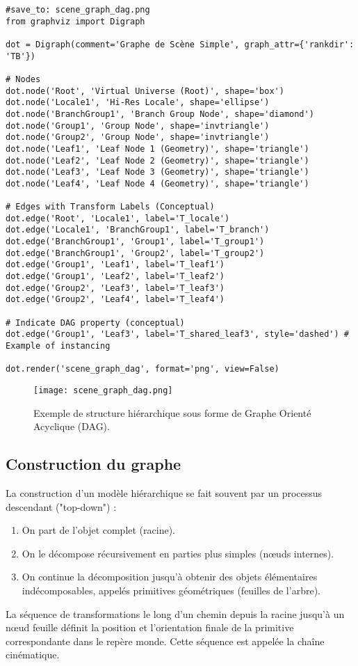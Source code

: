 \documentclass{article}
\begin{document}
\begin{verbatim}
#save_to: scene_graph_dag.png
from graphviz import Digraph

dot = Digraph(comment='Graphe de Scène Simple', graph_attr={'rankdir': 'TB'})

# Nodes
dot.node('Root', 'Virtual Universe (Root)', shape='box')
dot.node('Locale1', 'Hi-Res Locale', shape='ellipse')
dot.node('BranchGroup1', 'Branch Group Node', shape='diamond')
dot.node('Group1', 'Group Node', shape='invtriangle')
dot.node('Group2', 'Group Node', shape='invtriangle')
dot.node('Leaf1', 'Leaf Node 1 (Geometry)', shape='triangle')
dot.node('Leaf2', 'Leaf Node 2 (Geometry)', shape='triangle')
dot.node('Leaf3', 'Leaf Node 3 (Geometry)', shape='triangle')
dot.node('Leaf4', 'Leaf Node 4 (Geometry)', shape='triangle')

# Edges with Transform Labels (Conceptual)
dot.edge('Root', 'Locale1', label='T_locale')
dot.edge('Locale1', 'BranchGroup1', label='T_branch')
dot.edge('BranchGroup1', 'Group1', label='T_group1')
dot.edge('BranchGroup1', 'Group2', label='T_group2')
dot.edge('Group1', 'Leaf1', label='T_leaf1')
dot.edge('Group1', 'Leaf2', label='T_leaf2')
dot.edge('Group2', 'Leaf3', label='T_leaf3')
dot.edge('Group2', 'Leaf4', label='T_leaf4')

# Indicate DAG property (conceptual)
dot.edge('Group1', 'Leaf3', label='T_shared_leaf3', style='dashed') # Example of instancing

dot.render('scene_graph_dag', format='png', view=False)
\end{verbatim}

\begin{figure}[H]
\centering
\texttt{[image: scene\_graph\_dag.png]}
\caption{Exemple de structure hiérarchique sous forme de Graphe Orienté Acyclique (DAG).}
\label{fig:scene_graph_dag}
\end{figure}

\subsection{Construction du graphe}
La construction d'un modèle hiérarchique se fait souvent par un processus descendant ("top-down") :
\begin{enumerate}
    \item On part de l'objet complet (racine).
    \item On le décompose récursivement en parties plus simples (nœuds internes).
    \item On continue la décomposition jusqu'à obtenir des objets élémentaires indécomposables, appelés primitives géométriques (feuilles de l'arbre).
\end{enumerate}
La séquence de transformations le long d'un chemin depuis la racine jusqu'à un nœud feuille définit la position et l'orientation finale de la primitive correspondante dans le repère monde. Cette séquence est appelée la chaîne cinématique.
\end{document}
